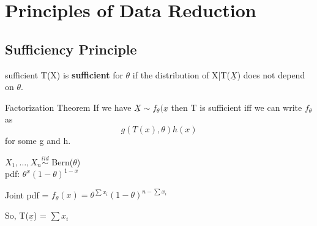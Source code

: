 \documentclass[11pt,fleqn]{book} %
\begin{document}




\chapter{Principles of Data Reduction}

\section{Sufficiency Principle}

\begin{definition}{sufficient}
	T(X) is \textbf{sufficient} for $\theta$ if the distribution of X|T($\underline{X}$) does not depend on $\theta$.  
\end{definition}

\begin{theorem}{Factorization Theorem}
	If we have $\underline{X} \sim f_\theta(\underline{x}$ then T is sufficient iff we can write $f_\theta$ as
	$$g(T(x),\theta)h(x)$$
	for some g and h.
\end{theorem}

\begin{example}
	$X_1, \dots, X_n \stackrel{iid}{\sim}$ Bern($\theta$)\\
	pdf: $\theta^x(1-\theta)^{1-x}$

	Joint pdf = $f_\theta(x) = \theta^{\sum x_i}(1-\theta)^{n-\sum x_i}$

	So, T($\underline{x}$) = $\sum x_i$
\end{example}
\end{document}
